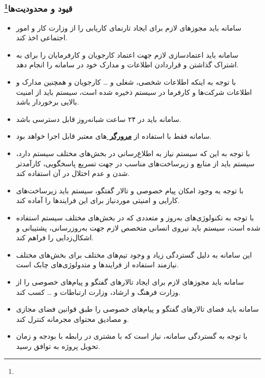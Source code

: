 \documentclass[12pt]{article}
\begin{document}
	\subsubsection{قیود و محدودیت‌ها\footnote{}}
	\begin{itemize}
		\item
		سامانه باید مجوز‌های لازم برای ایجاد تارنمای کاریابی را از وزارت کار و امور اجتماعی اخذ کند.
		\item
		سامانه باید اعتماد‌سازی لازم جهت اعتماد کارجویان و کارفرمایان را برای به اشتراک گذاشتن و قرار‌دادن اطلاعات و مدارک خود در سامانه را انجام دهد.
		\item
		با توجه به اینکه اطلاعات شخصی، شغلی و … کارجویان و همچنین مدارک و اطلاعات شرکت‌ها و کارفرما در سیستم ذخیره شده است، سیستم باید از امنیت بالایی برخوردار باشد.
		\item
		سامانه باید در ۲۴ ساعت شبانه‌روز قابل دسترسی باشد.
		\item
		سامانه فقط با استفاده از \textbf{\hyperref[ref:browser]{مرورگر }}‌های معتبر قابل اجرا خواهد‌ بود.
		\item
		با توجه به این که سیستم نیاز به اطلاع‌رسانی در بخش‌های مختلف سیستم دارد، سیستم باید از منابع و زیرساخت‌های مناسب در جهت تسریع پاسخگویی، کارآمدتر شدن و عدم اختلال در آن استفاده کند.
		\item
		با توجه به وجود امکان پیام خصوصی و تالار گفتگو، سیستم باید زیرساخت‌های کارایی و امنیتی مورد‌نیاز برای این فرایند‌ها را آماده کند.
		\item
		با توجه به تکنولوژی‌های به‌روز و متعددی که در بخش‌های مختلف سیستم استفاده شده است، سیستم باید نیروی انسانی متخصص لازم جهت به‌روزرسانی، پشتیبانی و اشکال‌زدایی را فراهم کند.
		\item
		این سامانه به دلیل گستردگی زیاد و وجود تیم‌های مختلف برای بخش‌های مختلف نیازمند استفاده از فرایند‌ها و متدولوژی‌های چابک است.
		\item
		سامانه باید مجوزهای لازم برای ایجاد تالار‌های گفتگو و پیام‌های خصوصی را از وزارت فرهنگ و ارشاد، وزارت ارتباطات و … کسب کند.
		\item
		سامانه باید فضای تالار‌های گفتگو و پیام‌های خصوصی را طبق قوانین فضای مجازی و مصادیق محتوای مجرمانه کنترل کند.
		\item
		با توجه به گستردگی سامانه، نیاز است که با مشتری در رابطه با بودجه و زمان تحویل پروژه به توافق رسید.
	\end{itemize}
\end{document}
